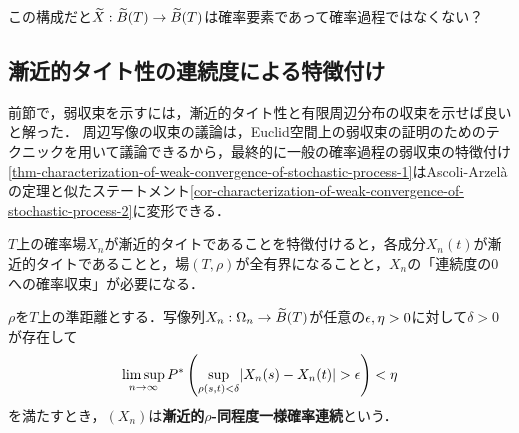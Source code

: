 \documentclass[uplatex,dvipdfmx]{jsreport}
\begin{document}
\begin{remarks}
    この構成だと$\widetilde{X}:\widetilde{B}(T)\to\widetilde{B}(T)$は確率要素であって確率過程ではなくない？
\end{remarks}

\subsection{漸近的タイト性の連続度による特徴付け}

\begin{tcolorbox}[colframe=ForestGreen, colback=ForestGreen!10!white,breakable,colbacktitle=ForestGreen!40!white,coltitle=black,fonttitle=\bfseries\sffamily,
title=漸近的タイト性は「連続度が0に確率収束する」ことに同値]
    前節で，弱収束を示すには，漸近的タイト性と有限周辺分布の収束を示せば良いと解った．
    周辺写像の収束の議論は，Euclid空間上の弱収束の証明のためのテクニックを用いて議論できるから，最終的に一般の確率過程の弱収束の特徴付け\ref{thm-characterization-of-weak-convergence-of-stochastic-process-1}はAscoli-Arzelàの定理と似たステートメント\ref{cor-characterization-of-weak-convergence-of-stochastic-process-2}に変形できる．

    $T$上の確率場$X_n$が漸近的タイトであることを特徴付けると，各成分$X_n(t)$が漸近的タイトであることと，場$(T,\rho)$が全有界になることと，$X_n$の「連続度の$0$への確率収束」が必要になる．
\end{tcolorbox}

\begin{definition}
    $\rho$を$T$上の準距離とする．写像列$X_n:\Omega_n\to\widetilde{B}(T)$が任意の$\epsilon,\eta>0$に対して$\delta>0$が存在して
    \[\limsup_{n\to\infty} P^*\left(\sup_{\rho(s,t)<\delta}\lvert X_n(s)-X_n(t)\rvert>\epsilon\right)<\eta\]
    を満たすとき，$(X_n)$は\textbf{漸近的$\rho$-同程度一様確率連続}という．
\end{definition}
\end{document}
